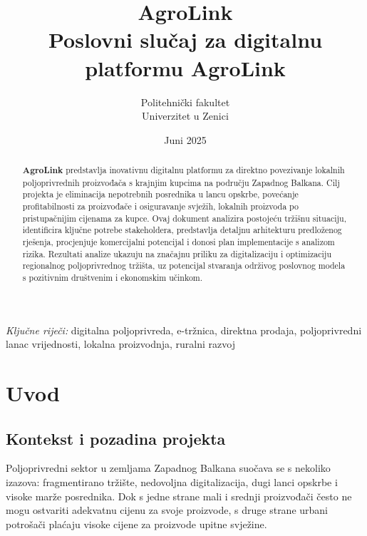 \documentclass[a4paper,12pt]{article}
\title{{\color{primarycolor}\Huge\textbf{AgroLink}\\[0.5cm]
\Large Poslovni slučaj za digitalnu platformu AgroLink}}
\author{Politehnički fakultet\\Univerzitet u Zenici}
\date{Juni 2025}
\begin{document}
\begin{titlepage}
    \maketitle
    \vfill
    \begin{abstract}
        \noindent 
        \textbf{AgroLink} predstavlja inovativnu digitalnu platformu za direktno povezivanje lokalnih 
        poljoprivrednih proizvođača s krajnjim kupcima na području Zapadnog Balkana. 
        Cilj projekta je eliminacija nepotrebnih posrednika u lancu opskrbe, povećanje 
        profitabilnosti za proizvođače i osiguravanje svježih, lokalnih proizvoda po pristupačnijim 
        cijenama za kupce. Ovaj dokument analizira postojeću tržišnu situaciju, identificira ključne 
        potrebe stakeholdera, predstavlja detaljnu arhitekturu predloženog rješenja, procjenjuje 
        komercijalni potencijal i donosi plan implementacije s analizom rizika. Rezultati 
        analize ukazuju na značajnu priliku za digitalizaciju i optimizaciju regionalnog 
        poljoprivrednog tržišta, uz potencijal stvaranja održivog poslovnog modela s pozitivnim 
        društvenim i ekonomskim učinkom.
    \end{abstract}
    \vfill
    \begin{center}
        \textit{Ključne riječi:} digitalna poljoprivreda, e-tržnica, direktna prodaja, 
        poljoprivredni lanac vrijednosti, lokalna proizvodnja, ruralni razvoj
    \end{center}
\end{titlepage}

\onehalfspacing
\tableofcontents
\newpage

\section{Uvod}
\label{sec:uvod}

\subsection{Kontekst i pozadina projekta}
Poljoprivredni sektor u zemljama Zapadnog Balkana suočava se s nekoliko izazova: fragmentirano tržište, nedovoljna digitalizacija, dugi lanci opskrbe i visoke marže posrednika. Dok s jedne strane mali i srednji proizvođači često ne mogu ostvariti adekvatnu cijenu za svoje proizvode, s druge strane urbani potrošači plaćaju visoke cijene za proizvode upitne svježine. 
\end{document}
